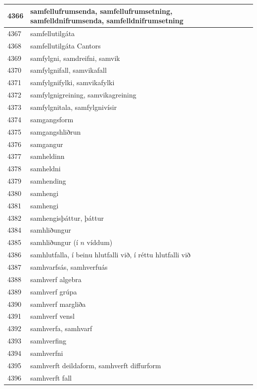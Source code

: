 \begin{longtable}{p{}|p{}|p{}|p{}|p{}}
\hline
4366 & samfellufrumsenda, samfellufrumsetning, samfelldnifrumsenda, samfelldnifrumsetning &  &  &  \\
\hline
4367 & samfellutilgáta &  &  &  \\
\hline
4368 & samfellutilgáta Cantors &  &  &  \\
\hline
4369 & samfylgni, samdreifni, samvik &  &  &  \\
\hline
4370 & samfylgnifall, samvikafall &  &  &  \\
\hline
4371 & samfylgnifylki, samvikafylki &  &  &  \\
\hline
4372 & samfylgnigreining, samvikagreining &  &  &  \\
\hline
4373 & samfylgnitala, samfylgnivísir &  &  &  \\
\hline
4374 & samgangsform &  &  &  \\
\hline
4375 & samgangshliðrun &  &  &  \\
\hline
4376 & samgangur &  &  &  \\
\hline
4377 & samheldinn &  &  &  \\
\hline
4378 & samheldni &  &  &  \\
\hline
4379 & samhending &  &  &  \\
\hline
4380 & samhengi &  &  &  \\
\hline
4381 & samhengi &  &  &  \\
\hline
4382 & samhengisþáttur, þáttur &  &  &  \\
\hline
4384 & samhliðungur &  &  &  \\
\hline
4385 & samhliðungur (í \(n\) víddum) &  &  &  \\
\hline
4386 & samhlutfalla, í beinu hlutfalli við, í réttu hlutfalli við &  &  &  \\
\hline
4387 & samhvarfsás, samhverfuás &  &  &  \\
\hline
4388 & samhverf algebra &  &  &  \\
\hline
4389 & samhverf grúpa &  &  &  \\
\hline
4390 & samhverf margliða &  &  &  \\
\hline
4391 & samhverf vensl &  &  &  \\
\hline
4392 & samhverfa, samhvarf &  &  &  \\
\hline
4393 & samhverfing &  &  &  \\
\hline
4394 & samhverfni &  &  &  \\
\hline
4395 & samhverft deildaform, samhverft diffurform &  &  &  \\
\hline
4396 & samhverft fall &  &  &  \\

\end{longtable}
